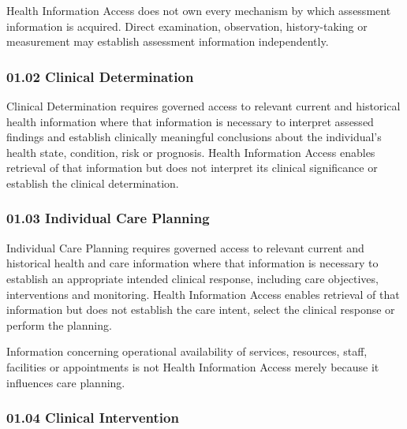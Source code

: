 Health Information Access does not own every mechanism by which assessment information is acquired. Direct examination, observation, history-taking or measurement may establish assessment information independently.

\label{rad:b2-1:54}
\subsubsection*{01.02 Clinical Determination}
\label{rad:b2-1:56}

\texttt{}

\label{rad:b2-1:58}

Clinical Determination requires governed access to relevant current and historical health information where that information is necessary to interpret assessed findings and establish clinically meaningful conclusions about the individual's health state, condition, risk or prognosis. Health Information Access enables retrieval of that information but does not interpret its clinical significance or establish the clinical determination.

\label{rad:b2-1:65}
\subsubsection*{01.03 Individual Care Planning}
\label{rad:b2-1:67}

\texttt{}

\label{rad:b2-1:69}

Individual Care Planning requires governed access to relevant current and historical health and care information where that information is necessary to establish an appropriate intended clinical response, including care objectives, interventions and monitoring. Health Information Access enables retrieval of that information but does not establish the care intent, select the clinical response or perform the planning.

\label{rad:b2-1:76}

Information concerning operational availability of services, resources, staff, facilities or appointments is not Health Information Access merely because it influences care planning.

\label{rad:b2-1:80}
\subsubsection*{01.04 Clinical Intervention}
\label{rad:b2-1:82}

